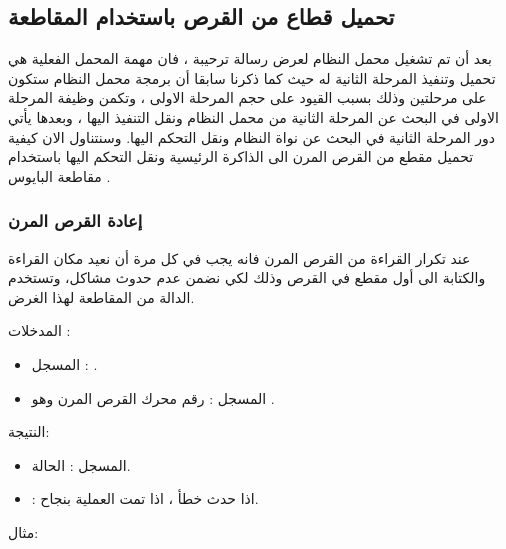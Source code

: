\documentclass[document.tex]{subfiles}
\begin{document}
\subsection{تحميل قطاع من القرص باستخدام المقاطعة }

بعد أن تم تشغيل محمل النظام لعرض رسالة ترحيبة ، فان مهمة المحمل الفعلية هي تحميل وتنفيذ المرحلة الثانية له حيث كما ذكرنا سابقا أن برمجة محمل النظام ستكون على مرحلتين وذلك بسبب القيود على حجم المرحلة الاولى ، وتكمن وظيفة المرحلة الاولى في البحث عن المرحلة الثانية من محمل النظام ونقل التنفيذ اليها ، وبعدها يأتي دور المرحلة الثانية في البحث عن نواة النظام ونقل التحكم اليها. وسنتناول الان كيفية تحميل مقطع من القرص المرن الى الذاكرة الرئيسية ونقل التحكم اليها باستخدام مقاطعة البايوس  .%

\subsubsection{إعادة القرص المرن}
عند تكرار القراءة من القرص المرن فانه يجب في كل مرة أن نعيد مكان القراءة والكتابة الى أول مقطع  في القرص وذلك لكي نضمن عدم حدوث مشاكل، وتستخدم الدالة  من المقاطعة  لهذا الغرض.

المدخلات :
\begin{itemize}
\item المسجل   : .
\item المسجل  : رقم محرك القرص المرن وهو .
\end{itemize}
النتيجة:
\begin{itemize}
\item المسجل  : الحالة.
\item {} :  اذا حدث خطأ ،  اذا تمت العملية بنجاح.

\end{itemize}

مثال:
\begin{english}
\lstset{numberstyle=\tiny,numbers=left,stepnumber=1,numbersep=5pt,tabsize=2,extendedchars=true,breaklines=true,frame=b,showspaces=false, showtabs=false,xleftmargin=10pt,framexleftmargin=10pt,framexrightmargin=5pt,framexbottommargin=4pt,showstringspaces=false,language=[x86masm]Assembler}


\end{english}
\end{document}

